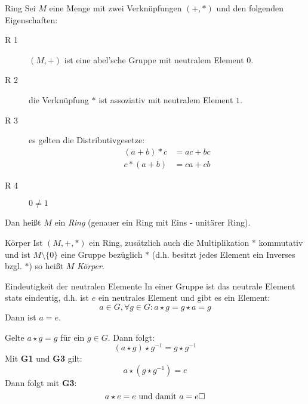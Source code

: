 \begin{definition}{Ring}
	Sei $M$ eine Menge mit zwei Verknüpfungen $(+,*)$ und den folgenden Eigenschaften:
	\begin{description}
	  \item[R 1] $(M,+)$ ist eine abel'sche Gruppe mit neutralem Element $0$.
	  \item[R 2] die Verknüpfung $*$ ist assoziativ mit neutralem Element $1$.
	  \item[R 3] es gelten die Distributivgesetze:
	  \begin{align*}
	    (a+b)* c&=ac+bc\\
	    c*(a+b)&=ca+cb
	  \end{align*}
	  \item[R 4] $0\neq 1$
	\end{description}
	Dan heißt $M$ ein \emph{Ring} (genauer ein Ring mit Eins - unitärer Ring).
\end{definition}

\begin{definition}{Körper}
	Ist $(M,+,*)$ ein Ring, zusätzlich auch die Multiplikation $*$ kommutativ und ist $M\setminus\{0\}$ eine Gruppe bezüglich $*$ (d.h. besitzt jedes Element ein Inverses bzgl. $*$) so heißt $M$ \emph{Körper}.
\end{definition}



\par

\begin{satz}{Eindeutigkeit der neutralen Elemente}
  In einer Gruppe ist das neutrale Element stats eindeutig, d.h. ist $e$ ein neutrales Element und gibt es ein Element:
  \begin{equation*}
    a\in G, \forall g\in G : a\star g = g\star a = g
  \end{equation*}
  Dann ist $a = e$.
\end{satz}


\beweis
Gelte $a\star g = g$ für ein $g\in G$. Dann folgt:
\begin{equation*}
  (a\star g)\star g^{-1}=g\star g^{-1}
\end{equation*}
Mit \textbf{G1} und \textbf{G3} gilt:
\begin{equation*}
  a\star (g\star g^{-1})=e
\end{equation*}
Dann folgt mit \textbf{G3}:
\begin{equation*}
  a\star e=e \text{ und damit } a=e \hfill\Box
\end{equation*}

